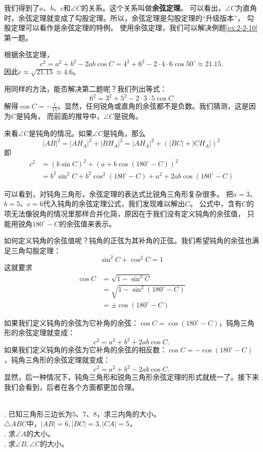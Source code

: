 \documentclass[12pt,UTF8]{ctexbook}
\begin{document}
我们得到了$a$、$b$、$c$和$\angle C$的关系。这个关系叫做\textbf{余弦定理}。
可以看出，$\angle C$为直角时，余弦定理就变成了勾股定理。所以，余弦定理是勾股定理的“升级版本”，
勾股定理可以看作是余弦定理的特例。
使用余弦定理，我们可以解决例题\ref{ex:2-2-10}第一题。
\begin{so}
    根据余弦定理，
    $$c^2 = a^2 + b^2 - 2ab \cos C = 4^2 + 6^2 - 2\cdot 4\cdot 6 \cos 50^\circ \approx 21.15.$$
    因此$c \approx \sqrt{21.15} \approx 4.6$。
\end{so}
用同样的方法，能否解决第二题呢？我们列出等式：
$$6^2 = 3^2 + 5^2 - 2 \cdot 3\cdot 5 \cos C $$
解得$\cos C = -\frac{1}{15}$。显然，任何锐角或直角的余弦都不是负数。我们猜测，这是因为$C$是钝角，
而前面的推导中，$\angle C$是锐角。

来看$\angle C$是钝角的情况。如果$\angle C$是钝角，那么
$$ |AB|^2 = |AH_A|^2 + |BH_A|^2 = |AH_A|^2 + (|BC| + |CH_A|)^2$$
即
\begin{align*}
    c^2 &= (b\sin C)^2 + (a + b\cos (180^\circ - C))^2  \\
    &= b^2\sin^2 C + b^2\cos^2 (180^\circ - C) + a^2 + 2ab\cos (180^\circ - C) 
\end{align*}

可以看到，对钝角三角形，余弦定理的表达式比锐角三角形复杂很多。
把$a=3$、$b=5$、$c=6$代入钝角的余弦定理公式，我们发现难以解出$C$。
公式中，含有$C$的项无法像锐角的情况里那样合并化简，原因在于我们没有定义钝角的余弦值，
只能用锐角$180^\circ - C$的余弦值来表示。

如何定义钝角的余弦值呢？钝角的正弦为其补角的正弦。我们希望钝角的余弦也满足三角勾股定理：
$$ \sin^2 C +  \cos^2 C = 1 $$
这就要求
\begin{align*}
    \cos C &= \sqrt{1 - \sin^2 C}  \\
    &= \sqrt{1 - \sin^2 (180^\circ - C)}  \\
    &= \pm\cos (180^\circ - C) 
\end{align*}

如果我们定义钝角的余弦为它补角的余弦：$ \cos C = \cos (180^\circ - C)$，钝角三角形的余弦定理就变成：
$$ c^2 = a^2 + b^2 + 2ab \cos C.$$
如果我们定义钝角的余弦为它补角的余弦的相反数：$ \cos C = -\cos (180^\circ - C)$，钝角三角形的余弦定理就变成：
$$ c^2 = a^2 + b^2 - 2ab \cos C.$$
显然，后一种情况下，钝角三角形和锐角三角形余弦定理的形式就统一了。接下来我们会看到，后者在各个方面都更加合理。

\begin{xt}
    \mbox{}\\
    . 已知三角形三边长为$5$、$7$、$8$，求三内角的大小。\\
    $\triangle ABC$中，$|AB|=6,|BC|=3,|CA|=5$，\\
    . 求$\angle A$的大小。\\
    . 求$\angle B, \angle C$的大小。
\end{xt}
\end{document}
